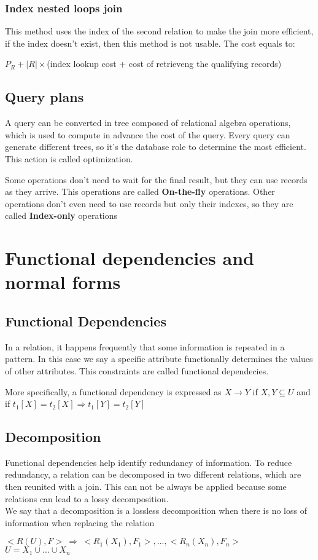 \documentclass[12pt, a4paper]{article}
\begin{document}
\subsubsection*{Index nested loops join}
This method uses the index of the second relation to make the join more efficient, if the index doesn't exist, then
this method is not usable. The cost equals to:
\begin{center}
    $P_{R}+|R|\times$(index lookup cost + cost of retrieveng the qualifying records)
\end{center}


\subsection{Query plans}
A query can be converted in tree composed of relational algebra operations, which is used to compute in advance the 
cost of the query. Every query can generate different trees, so it's the database role to determine the most 
efficient. This action is called optimization.

Some operations don't need to wait for the final result, but they can use records as they arrive. This operations are
called \textbf{On-the-fly} operations. Other operations don't even need to use records but only their indexes, so 
they are called \textbf{Index-only} operations


\newpage
\section{Functional dependencies and normal forms}
\subsection{Functional Dependencies}
In a relation, it happens frequently that some information is repeated in a pattern. In this case we say a 
specific attribute functionally determines the values of other attributes. This constraints are called functional 
dependecies.

More specifically, a functional dependency is expressed as $X\to Y$ if $X,Y\subseteq U$ and if 
$t_{1}[X]=t_{2}[X] \Rightarrow t_{1}[Y]=t_{2}[Y]$

\subsection{Decomposition}
Functional dependencies help identify redundancy of information. To reduce redundancy, a relation can be decomposed
in two different relations, which are then reunited with a join. This can not be always be applied because some 
relations can lead to a lossy decomposition.\\We say that a decomposition is a lossless decomposition when there 
is no loss of information when replacing the relation
\begin{center}
    $<R(U),F>\ \Rightarrow\ <R_{1}(X_{1}),F_{1}>,...,<R_{n}(X_{n}),F_{n}>$\\$U=X_{1}\cup ...\cup X_{n}$
\end{center}
\end{document}
